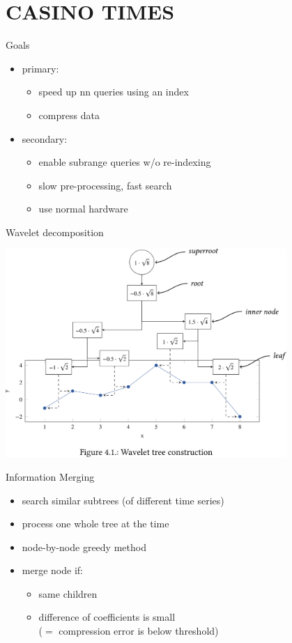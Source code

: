 \documentclass[14pt,t]{beamer}
\begin{document}
\section{CASINO TIMES}
\begin{frame}{Goals}
    \begin{itemize}
        \item primary:
            \begin{itemize}
                \item speed up nn queries using an index
                \item compress data
            \end{itemize}
        \item secondary:
            \begin{itemize}
                \item enable subrange queries w/o re-indexing
                \item slow pre-processing, fast search
                \item use normal hardware
            \end{itemize}
    \end{itemize}
\end{frame}
\begin{frame}[c]{Wavelet decomposition}
    \begin{center}
        \includegraphics[width = 0.8\textwidth]{img/wavelet-tree}
    \end{center}
\end{frame}
\begin{frame}{Information Merging}
    \begin{itemize}
        \item search similar subtrees (of different time series)
        \item process one whole tree at the time
        \item node-by-node greedy method
        \item merge node if:
            \begin{itemize}
                \item same children
                \item difference of coefficients is small\\($=$ compression error is below threshold)
            \end{itemize}
    \end{itemize}
\end{frame}
\end{document}
